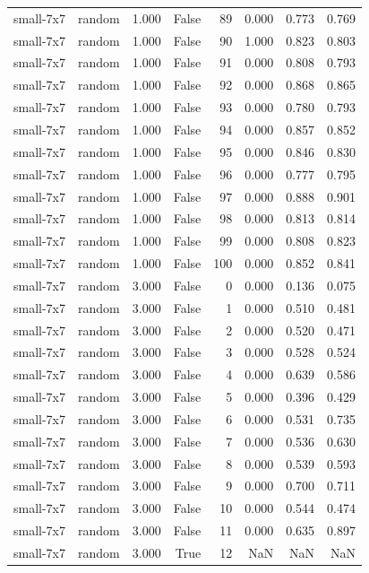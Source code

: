 \begin{tabular}{llrrrrrr}
small-7x7 & random & 1.000 & False & 89 & 0.000 & 0.773 & 0.769 \\
small-7x7 & random & 1.000 & False & 90 & 1.000 & 0.823 & 0.803 \\
small-7x7 & random & 1.000 & False & 91 & 0.000 & 0.808 & 0.793 \\
small-7x7 & random & 1.000 & False & 92 & 0.000 & 0.868 & 0.865 \\
small-7x7 & random & 1.000 & False & 93 & 0.000 & 0.780 & 0.793 \\
small-7x7 & random & 1.000 & False & 94 & 0.000 & 0.857 & 0.852 \\
small-7x7 & random & 1.000 & False & 95 & 0.000 & 0.846 & 0.830 \\
small-7x7 & random & 1.000 & False & 96 & 0.000 & 0.777 & 0.795 \\
small-7x7 & random & 1.000 & False & 97 & 0.000 & 0.888 & 0.901 \\
small-7x7 & random & 1.000 & False & 98 & 0.000 & 0.813 & 0.814 \\
small-7x7 & random & 1.000 & False & 99 & 0.000 & 0.808 & 0.823 \\
small-7x7 & random & 1.000 & False & 100 & 0.000 & 0.852 & 0.841 \\
small-7x7 & random & 3.000 & False & 0 & 0.000 & 0.136 & 0.075 \\
small-7x7 & random & 3.000 & False & 1 & 0.000 & 0.510 & 0.481 \\
small-7x7 & random & 3.000 & False & 2 & 0.000 & 0.520 & 0.471 \\
small-7x7 & random & 3.000 & False & 3 & 0.000 & 0.528 & 0.524 \\
small-7x7 & random & 3.000 & False & 4 & 0.000 & 0.639 & 0.586 \\
small-7x7 & random & 3.000 & False & 5 & 0.000 & 0.396 & 0.429 \\
small-7x7 & random & 3.000 & False & 6 & 0.000 & 0.531 & 0.735 \\
small-7x7 & random & 3.000 & False & 7 & 0.000 & 0.536 & 0.630 \\
small-7x7 & random & 3.000 & False & 8 & 0.000 & 0.539 & 0.593 \\
small-7x7 & random & 3.000 & False & 9 & 0.000 & 0.700 & 0.711 \\
small-7x7 & random & 3.000 & False & 10 & 0.000 & 0.544 & 0.474 \\
small-7x7 & random & 3.000 & False & 11 & 0.000 & 0.635 & 0.897 \\
small-7x7 & random & 3.000 & True & 12 & NaN & NaN & NaN \\

\end{tabular}
